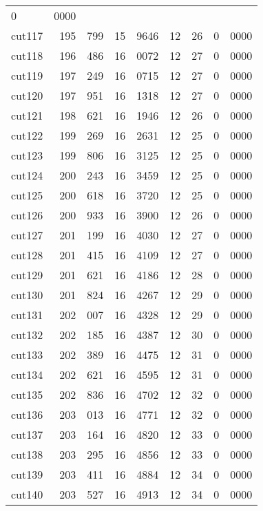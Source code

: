 \documentclass[11pt]{article}
\begin{document}
\begin{center}
\begin{tabular}{lr@{.}lr@{.}lr@{.}lr@{.}l}
        0&0000 \\
cut117 &
  195&799 &
    15&9646 &
      12&26 &
        0&0000 \\
cut118 &
  196&486 &
    16&0072 &
      12&27 &
        0&0000 \\
cut119 &
  197&249 &
    16&0715 &
      12&27 &
        0&0000 \\
cut120 &
  197&951 &
    16&1318 &
      12&27 &
        0&0000 \\
cut121 &
  198&621 &
    16&1946 &
      12&26 &
        0&0000 \\
cut122 &
  199&269 &
    16&2631 &
      12&25 &
        0&0000 \\
cut123 &
  199&806 &
    16&3125 &
      12&25 &
        0&0000 \\
cut124 &
  200&243 &
    16&3459 &
      12&25 &
        0&0000 \\
cut125 &
  200&618 &
    16&3720 &
      12&25 &
        0&0000 \\
cut126 &
  200&933 &
    16&3900 &
      12&26 &
        0&0000 \\
cut127 &
  201&199 &
    16&4030 &
      12&27 &
        0&0000 \\
cut128 &
  201&415 &
    16&4109 &
      12&27 &
        0&0000 \\
cut129 &
  201&621 &
    16&4186 &
      12&28 &
        0&0000 \\
cut130 &
  201&824 &
    16&4267 &
      12&29 &
        0&0000 \\
cut131 &
  202&007 &
    16&4328 &
      12&29 &
        0&0000 \\
cut132 &
  202&185 &
    16&4387 &
      12&30 &
        0&0000 \\
cut133 &
  202&389 &
    16&4475 &
      12&31 &
        0&0000 \\
cut134 &
  202&621 &
    16&4595 &
      12&31 &
        0&0000 \\
cut135 &
  202&836 &
    16&4702 &
      12&32 &
        0&0000 \\
cut136 &
  203&013 &
    16&4771 &
      12&32 &
        0&0000 \\
cut137 &
  203&164 &
    16&4820 &
      12&33 &
        0&0000 \\
cut138 &
  203&295 &
    16&4856 &
      12&33 &
        0&0000 \\
cut139 &
  203&411 &
    16&4884 &
      12&34 &
        0&0000 \\
cut140 &
  203&527 &
    16&4913 &
      12&34 &
        0&0000 \\

\end{tabular}
\end{center}
\end{document}
